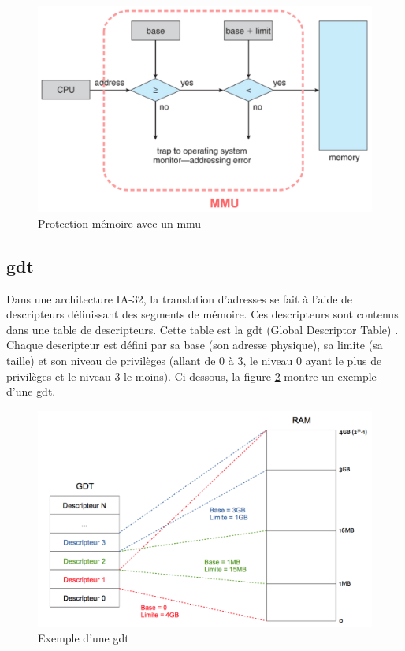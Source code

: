 \begin{figure}[!h]
  \centering
  \includegraphics[scale=0.4]{images/mmu.png}
  \caption{Protection mémoire avec un \acrshort{mmu}}
  \label{mmu}
\end{figure}


\subsection{\acrshort{gdt}}
Dans une architecture \acrshort{IA-32}, la translation d'adresses se fait à l'aide
de descripteurs définissant des segments de mémoire. Ces descripteurs sont contenus
dans une table de descripteurs. Cette table est la \acrshort{gdt} (Global Descriptor
Table) \cite{ref14}. Chaque descripteur est défini par sa base (son adresse physique),
sa limite (sa taille) et son niveau de privilèges (allant de 0 à 3, le niveau 0 
ayant le plus de privilèges et le niveau 3 le moins). Ci dessous, la figure \ref{gdt}
montre un exemple d'une \acrshort{gdt}.\cite{ref42}

\begin{figure}[!h]
  \centering
  \includegraphics[scale=0.7]{images/gdt.png}
  \caption{Exemple d'une \acrshort{gdt}}
  \label{gdt}
\end{figure}

